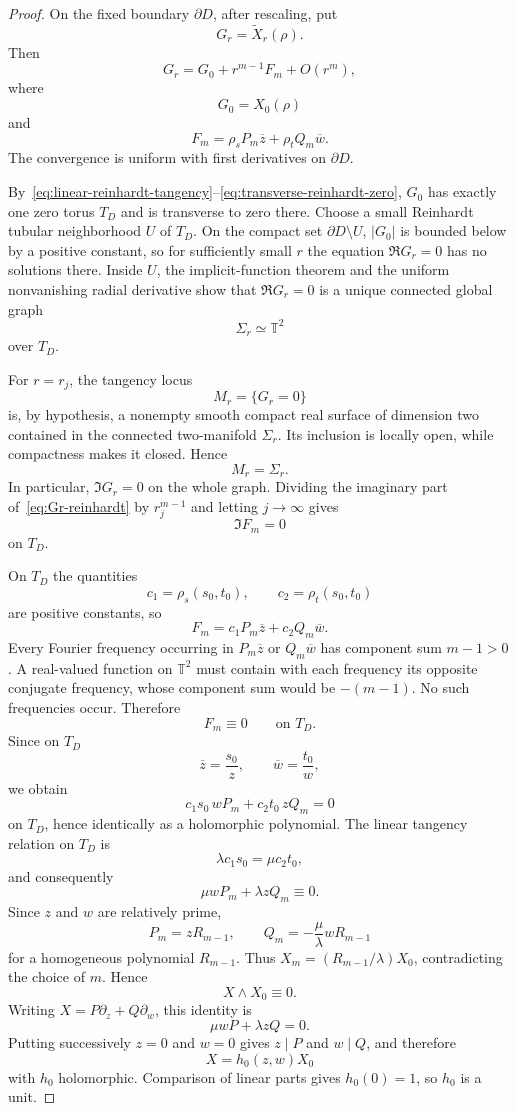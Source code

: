\documentclass[11pt,reqno]{article}
\theoremstyle{remark}
\newcommand{\T}{\mathbb T}
\newcommand{\ol}{\overline}
\begin{document}
\begin{proof}
On the fixed boundary $\partial D$, after rescaling, put
\[
 G_r=\widetilde X_r(\rho).
\]
Then
\begin{equation}\label{eq:Gr-reinhardt}
 G_r=G_0+r^{m-1}F_m+O(r^m),
\end{equation}
where
\[
 G_0=X_0(\rho)
\]
and
\[
 F_m=\rho_sP_m\ol z+\rho_tQ_m\ol w.
\]
The convergence is uniform with first derivatives on $\partial D$.

By~\eqref{eq:linear-reinhardt-tangency}--\eqref{eq:transverse-reinhardt-zero}, $G_0$ has exactly one zero torus $T_D$ and is transverse to zero there. Choose a small Reinhardt tubular neighborhood $U$ of $T_D$. On the compact set $\partial D\setminus U$, $|G_0|$ is bounded below by a positive constant, so for sufficiently small $r$ the equation $\Re G_r=0$ has no solutions there. Inside $U$, the implicit-function theorem and the uniform nonvanishing radial derivative show that $\Re G_r=0$ is a unique connected global graph
\[
 \Sigma_r\simeq\T^2
\]
over $T_D$.

For $r=r_j$, the tangency locus
\[
 M_r=\{G_r=0\}
\]
is, by hypothesis, a nonempty smooth compact real surface of dimension two contained in the connected two-manifold $\Sigma_r$. Its inclusion is locally open, while compactness makes it closed. Hence
\[
 M_r=\Sigma_r.
\]
In particular, $\Im G_r=0$ on the whole graph. Dividing the imaginary part of~\eqref{eq:Gr-reinhardt} by $r_j^{m-1}$ and letting $j\to\infty$ gives
\[
 \Im F_m=0
\]
on $T_D$.

On $T_D$ the quantities
\[
 c_1=\rho_s(s_0,t_0),\qquad c_2=\rho_t(s_0,t_0)
\]
are positive constants, so
\[
 F_m=c_1P_m\ol z+c_2Q_m\ol w.
\]
Every Fourier frequency occurring in $P_m\ol z$ or $Q_m\ol w$ has component sum $m-1>0$. A real-valued function on $\T^2$ must contain with each frequency its opposite conjugate frequency, whose component sum would be $-(m-1)$. No such frequencies occur. Therefore
\[
 F_m\equiv0\qquad\text{on }T_D.
\]
Since on $T_D$
\[
 \ol z=\frac{s_0}{z},\qquad \ol w=\frac{t_0}{w},
\]
we obtain
\[
 c_1s_0\,wP_m+c_2t_0\,zQ_m=0
\]
on $T_D$, hence identically as a holomorphic polynomial. The linear tangency relation on $T_D$ is
\[
 \lambda c_1s_0=\mu c_2t_0,
\]
and consequently
\[
 \mu wP_m+\lambda zQ_m\equiv0.
\]
Since $z$ and $w$ are relatively prime,
\[
 P_m=zR_{m-1},\qquad
 Q_m=-\frac{\mu}{\lambda}wR_{m-1}
\]
for a homogeneous polynomial $R_{m-1}$. Thus $X_m=(R_{m-1}/\lambda)X_0$, contradicting the choice of $m$. Hence
\[
 X\wedge X_0\equiv0.
\]
Writing $X=P\partial_z+Q\partial_w$, this identity is
\[
 \mu wP+\lambda zQ=0.
\]
Putting successively $z=0$ and $w=0$ gives $z\mid P$ and $w\mid Q$, and therefore
\[
 X=h_0(z,w)X_0
\]
with $h_0$ holomorphic. Comparison of linear parts gives $h_0(0)=1$, so $h_0$ is a unit.
\end{proof}
\end{document}
